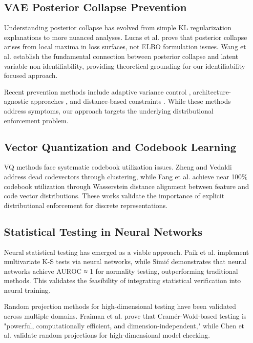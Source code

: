 \documentclass[11pt]{article}
\begin{document}
\subsection{VAE Posterior Collapse Prevention}

Understanding posterior collapse has evolved from simple KL regularization explanations to more nuanced analyses. Lucas et al. \cite{lucas2019dont} prove that posterior collapse arises from local maxima in loss surfaces, not ELBO formulation issues. Wang et al. \cite{wang2023posterior} establish the fundamental connection between posterior collapse and latent variable non-identifiability, providing theoretical grounding for our identifiability-focused approach.

Recent prevention methods include adaptive variance control \cite{takida2022preventing}, architecture-agnostic approaches \cite{song2024toward}, and distance-based constraints \cite{razavi2019preventing}. While these methods address symptoms, our approach targets the underlying distributional enforcement problem.

\subsection{Vector Quantization and Codebook Learning}

VQ methods face systematic codebook utilization issues. Zheng and Vedaldi \cite{zheng2023online} address dead codevectors through clustering, while Fang et al. \cite{fang_2025_vq_wasserstein} achieve near 100\% codebook utilization through Wasserstein distance alignment between feature and code vector distributions. These works validate the importance of explicit distributional enforcement for discrete representations.

\subsection{Statistical Testing in Neural Networks}

Neural statistical testing has emerged as a viable approach. Paik et al. \cite{paik2023maximum} implement multivariate K-S tests via neural networks, while Simić \cite{simic2020testing} demonstrates that neural networks achieve AUROC ≈ 1 for normality testing, outperforming traditional methods. This validates the feasibility of integrating statistical verification into neural training.

Random projection methods for high-dimensional testing have been validated across multiple domains. Fraiman et al. \cite{fraiman2021application} prove that Cramér-Wold-based testing is "powerful, computationally efficient, and dimension-independent," while Chen et al. \cite{chen2024model} validate random projections for high-dimensional model checking.
\end{document}
